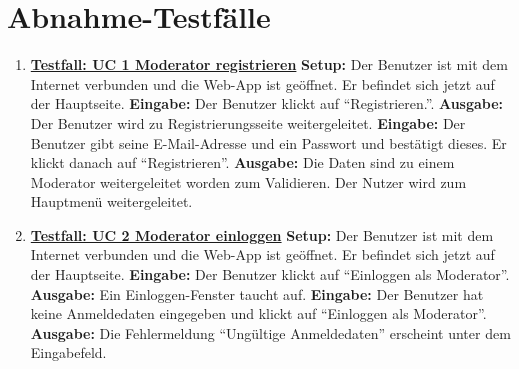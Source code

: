 \section{Abnahme-Testfälle}
\begin{enumerate}
	\item \underline{\textbf{Testfall: UC 1 Moderator registrieren}} \linebreak
	\textbf{Setup:} Der Benutzer ist mit dem Internet verbunden und die Web-App ist geöffnet. Er befindet sich jetzt auf der Hauptseite.\linebreak
	\textbf{Eingabe:} Der Benutzer klickt auf ``Registrieren.''.\linebreak
	\textbf{Ausgabe:} Der Benutzer wird zu Registrierungsseite weitergeleitet.\linebreak
	\textbf{Eingabe:} Der Benutzer gibt seine E-Mail-Adresse und ein Passwort und bestätigt dieses. Er klickt danach auf ``Registrieren''. \linebreak
	\textbf{Ausgabe:} Die Daten sind zu einem Moderator weitergeleitet worden zum Validieren. Der Nutzer wird zum Hauptmenü weitergeleitet.
	
	\item \underline{\textbf{Testfall: UC 2 Moderator einloggen}} \linebreak
	\textbf{Setup:} Der Benutzer ist mit dem Internet verbunden und die Web-App ist geöffnet. Er befindet sich jetzt auf der Hauptseite. \linebreak
	\textbf{Eingabe:} Der Benutzer klickt auf ``Einloggen als Moderator''. \linebreak
	\textbf{Ausgabe:} Ein Einloggen-Fenster taucht auf.\linebreak
	\textbf{Eingabe:} Der Benutzer hat keine Anmeldedaten eingegeben und klickt auf ``Einloggen als Moderator''.\linebreak
	\textbf{Ausgabe:} Die Fehlermeldung ``Ungültige Anmeldedaten'' erscheint unter dem Eingabefeld.
	

\end{enumerate}
